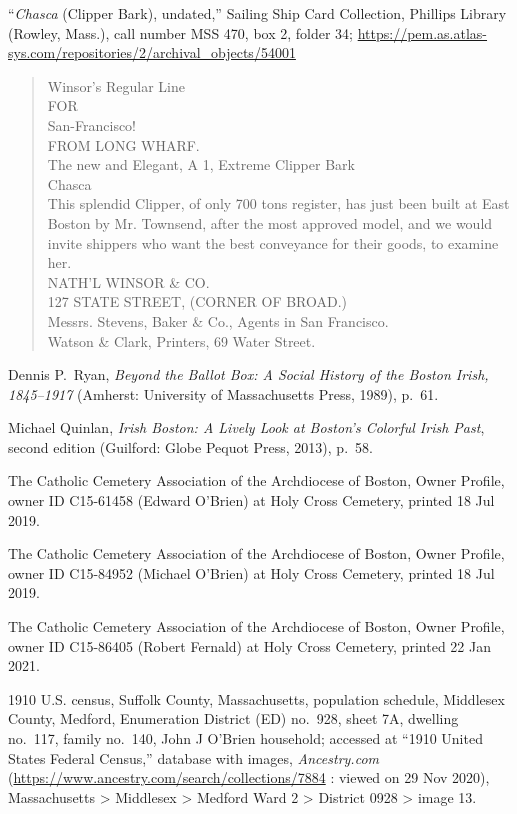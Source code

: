 \begin{thebibliography}{999}
	``\textit{Chasca} (Clipper Bark), undated,'' Sailing Ship Card Collection, Phillips Library (Rowley, Mass.), call number MSS 470, box 2, folder 34; \url{https://pem.as.atlas-sys.com/repositories/2/archival_objects/54001}\\
	\begin{quote}
	Winsor's Regular Line\\
	FOR\\
	San-Francisco!\\
	FROM LONG WHARF.\\
	The new and Elegant, A 1, Extreme Clipper Bark\\
	Chasca\\
	This splendid Clipper, of only 700 tons register, has just been built at East Boston by Mr. Townsend, after the most approved model, and we would invite shippers who want the best conveyance for their goods, to examine her.\\
	NATH'L WINSOR \& CO.\\
	127 STATE STREET, (CORNER OF BROAD.)\\
	Messrs. Stevens, Baker \& Co., Agents in San Francisco.\\
	Watson \& Clark, Printers, 69 Water Street.	
	\end{quote}

	Dennis P.\ Ryan, \textit{Beyond the Ballot Box: A Social History of the Boston Irish, 1845--1917} (Amherst: University of Massachusetts Press, 1989), p.\ 61.
	
	Michael Quinlan, \textit{Irish Boston: A Lively Look at Boston's Colorful Irish Past}, second edition (Guilford: Globe Pequot Press, 2013), p.\ 58.
	
	The Catholic Cemetery Association of the Archdiocese of Boston, Owner Profile, owner ID C15-61458 (Edward O'Brien) at Holy Cross Cemetery, printed 18 Jul 2019.
	
	The Catholic Cemetery Association of the Archdiocese of Boston, Owner Profile, owner ID C15-84952 (Michael O'Brien) at Holy Cross Cemetery, printed 18 Jul 2019.
	
	The Catholic Cemetery Association of the Archdiocese of Boston, Owner Profile, owner ID C15-86405 (Robert Fernald) at Holy Cross Cemetery, printed 22 Jan 2021.
	
	1910 U.S. census, Suffolk County, Massachusetts, population schedule, Middlesex County, Medford, Enumeration District (ED) no.\ 928, sheet 7A, dwelling no.\ 117, family no.\ 140, John J O'Brien household; accessed at ``1910 United States Federal Census,'' database with images, \textit{Ancestry.com} (\url{https://www.ancestry.com/search/collections/7884} : viewed on 29 Nov 2020), Massachusetts > Middlesex > Medford Ward 2 > District 0928 > image 13.
	

\end{thebibliography}
